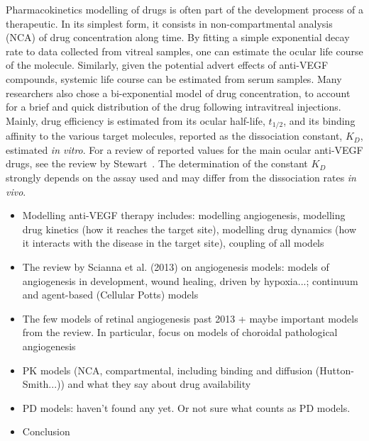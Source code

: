 \documentclass[12pt,a4paper]{article}
\begin{document}
Pharmacokinetics modelling of drugs is often part of the development process of a therapeutic.
In its simplest form, it consists in non-compartmental analysis (NCA) of drug concentration along time.
By fitting a simple exponential decay rate to data collected from vitreal samples, one can estimate the ocular life course of the molecule.
Similarly, given the potential advert effects of anti-VEGF compounds, systemic life course can be estimated from serum samples.
Many researchers also chose a bi-exponential model of drug concentration, to account for a brief and quick distribution of the drug following intravitreal injections.
Mainly, drug efficiency is estimated from its ocular half-life, $t_{1/2}$, and its binding affinity to the various target molecules, reported as the dissociation constant, $K_D$, estimated \textit{in vitro}.
For a review of reported values for the main ocular anti-VEGF drugs, see the review by Stewart~\cite{stewart_pharmacokinetics_2014}.
The determination of the constant $K_D$ strongly depends on the assay used and may differ from the dissociation rates \textit{in vivo}.
\newpage

\begin{itemize}
\item Modelling anti-VEGF therapy includes: modelling angiogenesis, modelling drug kinetics (how it reaches the target site), modelling drug dynamics (how it interacts with the disease in the target site), coupling of all models
\item The review by Scianna et al. (2013) on angiogenesis models: models of angiogenesis in development, wound healing, driven by hypoxia...; continuum and agent-based (Cellular Potts) models
\item The few models of retinal angiogenesis past 2013 + maybe important models from the review. In particular, focus on models of choroidal pathological angiogenesis 
\item PK models (NCA, compartmental, including binding and diffusion (Hutton-Smith...)) and what they say about drug availability
\item PD models: haven't found any yet. Or not sure what counts as PD models.
\item Conclusion
\end{itemize}


{\normalsize }
\end{document}
